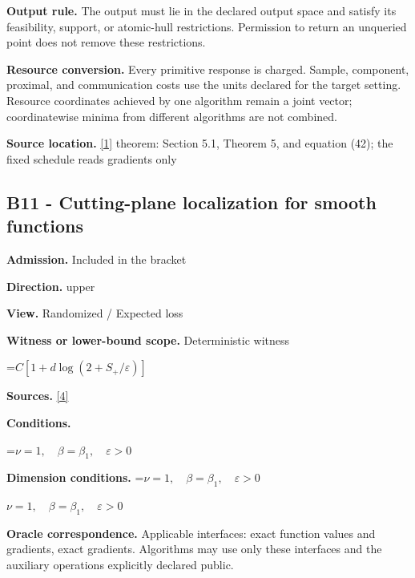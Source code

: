 \documentclass[10pt,a4paper]{article}
\newcommand{\AtlasMath}[1]{\par\begingroup\centering\setbox0=\hbox{$\displaystyle #1$}\ifdim\wd0>1.4\linewidth\typeout{ATLAS WIDE FORMULA: \the\wd0}\fi\ifdim\wd0>\linewidth\resizebox{\linewidth}{!}{\box0}\else\box0\fi\par\endgroup}
\newcommand{\AtlasInlineMath}[1]{\begingroup\setbox0=\hbox{$#1$}\ifdim\wd0>.4\linewidth\endgroup\AtlasMath{#1}\else\endgroup$#1$\fi}
\begin{document}
\textbf{Output rule.} The output must lie in the declared output space and satisfy its feasibility, support, or atomic-hull restrictions. Permission to return an unqueried point does not remove these restrictions.



\textbf{Resource conversion.} Every primitive response is charged. Sample, component, proximal, and communication costs use the units declared for the target setting. Resource coordinates achieved by one algorithm remain a joint vector; coordinatewise minima from different algorithms are not combined.



\textbf{Source location.} \href{https://optimization-online.org/wp-content/uploads/2010/12/2865.pdf}{[1]} theorem: Section 5.1, Theorem 5, and equation (42); the fixed schedule reads gradients only



\subsection{B11 - Cutting-plane localization for smooth functions}


\textbf{Admission.} Included in the bracket



\textbf{Direction.} upper



\textbf{View.} Randomized / Expected loss



\textbf{Witness or lower-bound scope.} Deterministic witness



\AtlasMath{C[1+d\log(2+S_+/\varepsilon)]}


\textbf{Sources.} \href{https://arxiv.org/pdf/2609.32910}{[4]}



\textbf{Conditions.}
\AtlasMath{\nu=1,\quad\beta=\beta_1,\quad\varepsilon>0}




\textbf{Dimension conditions.} \AtlasInlineMath{\nu=1,\quad\beta=\beta_1,\quad\varepsilon>0}



\textbf{Oracle correspondence.} Applicable interfaces: exact function values and gradients, exact gradients. Algorithms may use only these interfaces and the auxiliary operations explicitly declared public.
\end{document}

